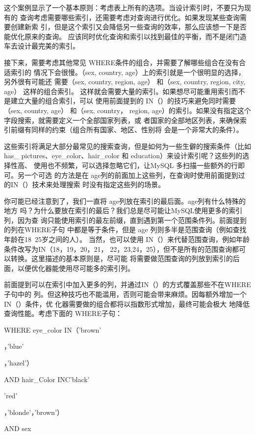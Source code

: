 这个案例显示了一个基本原则：考虑表上所有的选项。当设计索引时，不要只为现有的
查询考虑需要哪些索引，还需要考虑对查询进行优化。如果发现某些查询需要创建新索
引，但是这个索引又会降低另一些查询的效率，那么应该想一下是否能优化原来的查询。
应该同时优化查询和索引以找到最佳的平衡，而不是闭门造车去设计最完美的索引。

接下来，需要考虑其他常见 WHERE条件的组合，并需要了解哪些组合在没有合适索引的
情况下会很慢。（sex, country, age）上的索引就是一个很明显的选择，另外很有可能还
需要（sex, country, region, age） 和（sex, country, region, city, age） 这样的组合索引。
这样就会需要大量的索引。如果想尽可能重用索引而不是建立大量的组合索引，可以
使用前面提到的 IN（）的技巧来避免同时需要（sex, country, age） 和（sex, country，
region, age）的索引。如果没有指定这个字段搜索，就需要定义一个全部国家列表，或
者国家的全部地区列表，来确保索引前缀有同样的约束（组合所有国家、地区、性别将
会是一个非常大的条件）。

这些索引将满足大部分最常见的搜索查询，但是如何为一些生僻的搜索条件（比如 has\_
pictures、eye\_color、hair\_color 和 education）来设计索引呢？这些列的选择性高、
使用也不频繁，可以选择忽略它们，让MySQL 多扫描一些额外的行即可。另一个可选
的方法是在 age列的前面加上这些列，在查询时使用前面提到过的IN（）技术来处理搜索
时没有指定这些列的场景。

你可能已经注意到了，我们一直将 age列放在索引的最后面。age列有什么特殊的地方
吗？为什么要放在索引的最后？我们总是尽可能让MySQL使用更多的索引列，因为查
询只能使用索引的最左前缀，直到遇到第一个范围条件列。前面提到的列在WHERE子句
中都是等于条件，但是 age 列则多半是范围查询（例如查找年龄在18~25岁之间的人）。
当然，也可以使用 IN（）来代替范围查询，例如年龄条件改写为IN（18，19，20，21，
22，23,24，25），但不是所有的范围查询都可以转换。这里描述的基本原则是，尽可能
将需要做范围查询的列放到索引的后面，以便优化器能使用尽可能多的索引列。

前面提到可以在索引中加入更多的列，并通过IN（）的方式覆盖那些不在WHERE 子句中的
列。但这种技巧也不能滥用，否则可能会带来麻烦。因每额外增加一个 IN（）条件，优
化器需要做的组合都将以指数形式增加，最终可能会极大 地降低查询性能。考虑下面的
WHERE子句：

WHERE eye\_color IN（'brown'

，'blue'

，'hazel'）

AND hair\_Color INC'black'

'red'

，'blonde'，'brown'）

AND sex

